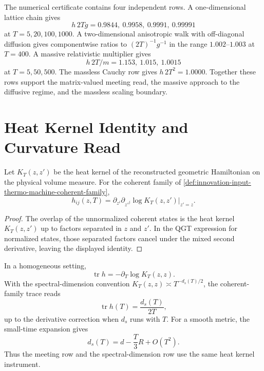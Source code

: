 \begin{principle}
\label{prin:innovation-input-thermo-numerical-meeting-witnesses}
The numerical certificate contains four independent rows. A
one-dimensional lattice chain gives
$$
h\,2Tg=0.9844,\ 0.9958,\ 0.9991,\ 0.99991
$$
at $T=5,20,100,1000$. A two-dimensional anisotropic walk with
off-diagonal diffusion gives componentwise ratios to
$(2T)^{-1}g^{-1}$ in the range $1.002$--$1.003$ at $T=400$. A massive
relativistic multiplier gives
$$
h\,2T/m=1.153,\ 1.015,\ 1.0015
$$
at $T=5,50,500$. The massless Cauchy row gives $h\,2T^2=1.0000$.
Together these rows support the matrix-valued meeting read, the massive
approach to the diffusive regime, and the massless scaling boundary.
\end{principle}

\section{Heat Kernel Identity and Curvature Read}
\label{sec:innovation-input-thermo-curvature-read}

\begin{theorem}
\label{thm:innovation-input-thermo-heat-kernel-qgt-identity}
Let $K_T(z,z')$ be the heat kernel of the reconstructed geometric
Hamiltonian on the physical volume measure. For the coherent family of
\autoref{def:innovation-input-thermo-machine-coherent-family},
$$
h_{ij}(z,T)
=
\partial_{z^i}\partial_{z'^j}\log K_T(z,z')\big|_{z'=z}.
$$
\end{theorem}

\begin{proof}
The overlap of the unnormalized coherent states is the heat kernel
$K_T(z,z')$ up to factors separated in $z$ and $z'$. In the QGT expression
for normalized states, those separated factors cancel under the mixed
second derivative, leaving the displayed identity.
\end{proof}

\begin{corollary}
\label{cor:innovation-input-thermo-spectral-dimension-merger}
In a homogeneous setting,
$$
\operatorname{tr}h
=
-\partial_T\log K_T(z,z).
$$
With the spectral-dimension convention
$K_T(z,z)\asymp T^{-d_s(T)/2}$, the coherent-family trace reads
$$
\operatorname{tr}h(T)=\frac{d_s(T)}{2T},
$$
up to the derivative correction when $d_s$ runs with $T$. For a smooth
metric, the small-time expansion gives
$$
d_s(T)=d-\frac{T}{3}R+O(T^2).
$$
Thus the meeting row and the spectral-dimension row use the same heat
kernel instrument.
\end{corollary}

